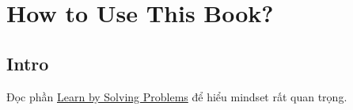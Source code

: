 \documentclass[a4paper]{report}
\begin{document}
\maketitle
\tableofcontents

\chapter{How to Use This Book?}

\section{Intro}

Đọc phần \href{https://artofproblemsolving.com/ebooks/prealgebra-ebook/par/154183}{Learn by Solving Problems} để hiểu mindset rất quan trọng.










\end{document}
